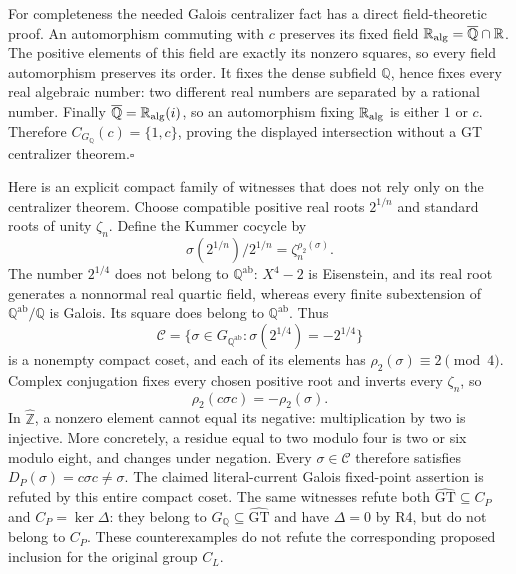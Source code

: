 For completeness the needed Galois centralizer fact has a direct
field-theoretic proof. An automorphism commuting with $c$ preserves
its fixed field $\mathbb R_{\rm alg}=\overline{\mathbb Q}\cap\mathbb R$.
The positive elements of this field are exactly its nonzero squares,
so every field automorphism preserves its order. It fixes the dense
subfield $\mathbb Q$, hence fixes every real algebraic number: two
different real numbers are separated by a rational number. Finally
$\overline{\mathbb Q}=\mathbb R_{\rm alg}(i)$, so an automorphism
fixing $\mathbb R_{\rm alg}$ is either $1$ or $c$. Therefore
$C_{G_{\mathbb Q}}(c)=\{1,c\}$, proving the displayed intersection
without a GT centralizer theorem.\hfill$\square$

Here is an explicit compact family of witnesses that does not rely
only on the centralizer theorem. Choose compatible positive real
roots $2^{1/n}$ and standard roots of unity $\zeta_n$. Define the
Kummer cocycle by
\[
 \sigma(2^{1/n})/2^{1/n}=\zeta_n^{\rho_2(\sigma)}.
\]
The number $2^{1/4}$ does not belong to $\mathbb Q^{\mathrm{ab}}$:
$X^4-2$ is Eisenstein, and its real root generates a nonnormal real
quartic field, whereas every finite subextension of
$\mathbb Q^{\mathrm{ab}}/\mathbb Q$ is Galois. Its square does belong
to $\mathbb Q^{\mathrm{ab}}$. Thus
\[
 \mathcal C=
 \{\sigma\in G_{\mathbb Q^{\mathrm{ab}}}:
                    \sigma(2^{1/4})=-2^{1/4}\}
\]
is a nonempty compact coset, and each of its elements has
$\rho_2(\sigma)\equiv2\pmod4$.
Complex conjugation fixes every chosen positive root and inverts
every $\zeta_n$, so
\[
                 \rho_2(c\sigma c)=-\rho_2(\sigma).
\]
In $\widehat{\mathbb Z}$, a nonzero element cannot equal its negative:
multiplication by two is injective. More concretely, a residue equal
to two modulo four is two or six modulo eight, and changes under
negation. Every $\sigma\in\mathcal C$ therefore satisfies
$D_P(\sigma)=c\sigma c\ne\sigma$. The claimed literal-current
Galois fixed-point assertion is refuted by this entire compact coset.
The same witnesses refute both
$\widehat{\mathrm{GT}}\subseteq C_P$ and $C_P=\ker\Delta$:
they belong to $G_{\mathbb Q}\subseteq\widehat{\mathrm{GT}}$ and
have $\Delta=0$ by R4, but do not belong to $C_P$. These
counterexamples do not refute the corresponding proposed inclusion
for the original group $C_L$.


